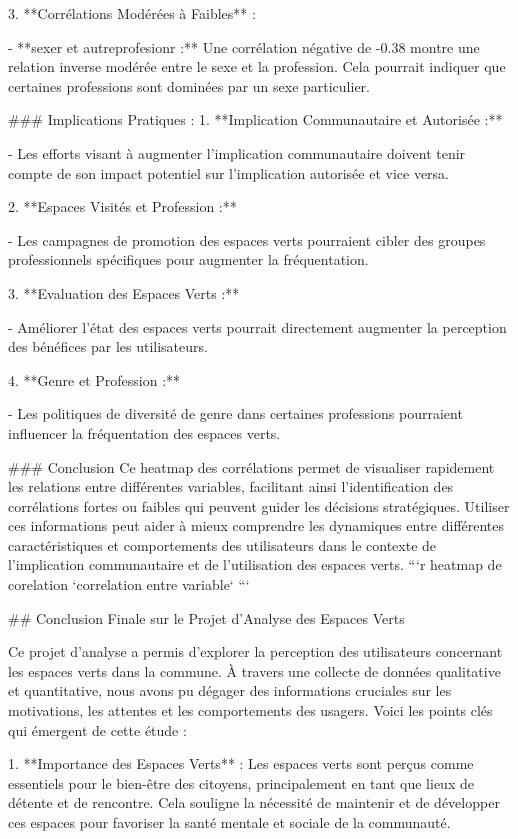3. **Corrélations Modérées à Faibles** :

- **sexer et autreprofesionr :** Une corrélation négative de -0.38 montre une relation inverse modérée entre le sexe et la profession. Cela pourrait indiquer que certaines professions sont dominées par un sexe particulier.

### Implications Pratiques :
1. **Implication Communautaire et Autorisée :**

- Les efforts visant à augmenter l'implication communautaire doivent tenir compte de son impact potentiel sur l'implication autorisée et vice versa.

2. **Espaces Visités et Profession :**

- Les campagnes de promotion des espaces verts pourraient cibler des groupes professionnels spécifiques pour augmenter la fréquentation.

3. **Evaluation des Espaces Verts :**

- Améliorer l'état des espaces verts pourrait directement augmenter la perception des bénéfices par les utilisateurs.

4. **Genre et Profession :**

- Les politiques de diversité de genre dans certaines professions pourraient influencer la fréquentation des espaces verts.

### Conclusion
Ce heatmap des corrélations permet de visualiser rapidement les relations entre différentes variables, facilitant ainsi l'identification des corrélations fortes ou faibles qui peuvent guider les décisions stratégiques. Utiliser ces informations peut aider à mieux comprendre les dynamiques entre différentes caractéristiques et comportements des utilisateurs dans le contexte de l'implication communautaire et de l'utilisation des espaces verts.
```{r heatmap de corelation}
`correlation entre variable`
```

## Conclusion Finale sur le Projet d'Analyse des Espaces Verts

Ce projet d'analyse a permis d'explorer la perception des utilisateurs concernant les espaces verts dans la commune. À travers une collecte de données qualitative et quantitative, nous avons pu dégager des informations cruciales sur les motivations, les attentes et les comportements des usagers. Voici les points clés qui émergent de cette étude :

1. **Importance des Espaces Verts** :
   Les espaces verts sont perçus comme essentiels pour le bien-être des citoyens, principalement en tant que lieux de détente et de rencontre. Cela souligne la nécessité de maintenir et de développer ces espaces pour favoriser la santé mentale et sociale de la communauté.

